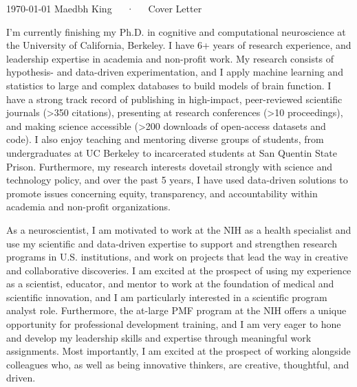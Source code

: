 \documentclass[9pt, a4paper]{maedbh-cv}
\begin{document}
\makecvheader[R]

\makecvfooter
  {\today}
  {Maedbh King~~~·~~~Cover Letter}
  {}
  
\makelettertitle

\begin{cvletter}

I'm currently finishing my Ph.D. in cognitive and computational neuroscience at the University of California, Berkeley. I have 6+ years of research experience, and leadership expertise in academia and non-profit work. My research consists of hypothesis- and data-driven experimentation, and I apply machine learning and statistics to large and complex databases to build models of brain function. I have a strong track record of publishing in high-impact, peer-reviewed scientific journals (>350 citations), presenting at research conferences (>10 proceedings), and making science accessible (>200 downloads of open-access datasets and code). I also enjoy teaching and mentoring diverse groups of students, from undergraduates at UC Berkeley to incarcerated students at San Quentin State Prison. Furthermore, my research interests dovetail strongly with science and technology policy, and over the past 5 years, I have used data-driven solutions to promote issues concerning equity, transparency, and accountability within academia and non-profit organizations. 

As a neuroscientist, I am motivated to work at the NIH as a health specialist and use my scientific and data-driven expertise to support and strengthen research programs in U.S. institutions, and work on projects that lead the way in creative and collaborative discoveries. I am excited at the prospect of using my experience as a scientist, educator, and mentor to work at the foundation of medical and scientific innovation, and I am particularly interested in a scientific program analyst role. Furthermore, the at-large PMF program at the NIH offers a unique opportunity for professional development training, and I am very eager to hone and develop my leadership skills and expertise through meaningful work assignments. Most importantly, I am excited at the prospect of working alongside colleagues who, as well as being innovative thinkers, are creative, thoughtful, and driven. 


\end{cvletter}
\end{document}
